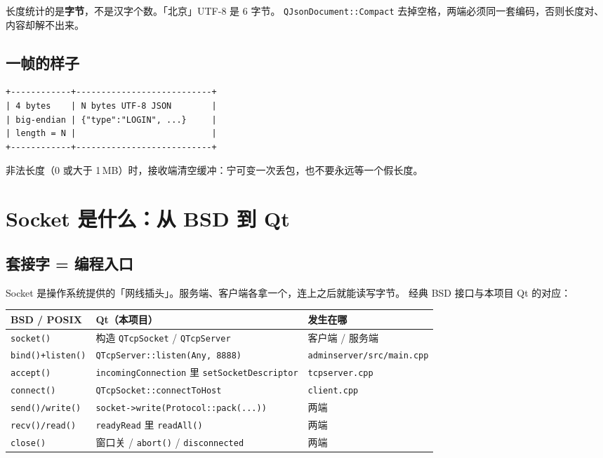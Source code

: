 \documentclass[UTF8,a4paper,11pt]{ctexart}
\begin{document}
长度统计的是\textbf{字节}，不是汉字个数。「北京」UTF-8 是 6 字节。
\texttt{QJsonDocument::Compact} 去掉空格，两端必须同一套编码，否则长度对、内容却解不出来。

\subsection{一帧的样子}

\begin{lstlisting}[language={}]
+------------+---------------------------+
| 4 bytes    | N bytes UTF-8 JSON        |
| big-endian | {"type":"LOGIN", ...}     |
| length = N |                           |
+------------+---------------------------+
\end{lstlisting}

非法长度（0 或大于 1\,MB）时，接收端清空缓冲：宁可变一次丢包，也不要永远等一个假长度。

\section{Socket 是什么：从 BSD 到 Qt}

\subsection{套接字 = 编程入口}

Socket 是操作系统提供的「网线插头」。服务端、客户端各拿一个，连上之后就能读写字节。
经典 BSD 接口与本项目 Qt 的对应：

\begin{center}
\begin{tabular}{lll}
\toprule
BSD / POSIX & Qt（本项目） & 发生在哪 \\
\midrule
\texttt{socket()} & 构造 \texttt{QTcpSocket} / \texttt{QTcpServer} & 客户端 / 服务端 \\
\texttt{bind()+listen()} & \texttt{QTcpServer::listen(Any, 8888)} & \texttt{adminserver/src/main.cpp} \\
\texttt{accept()} & \texttt{incomingConnection} 里 \texttt{setSocketDescriptor} & \texttt{tcpserver.cpp} \\
\texttt{connect()} & \texttt{QTcpSocket::connectToHost} & \texttt{client.cpp} \\
\texttt{send()/write()} & \texttt{socket->write(Protocol::pack(...))} & 两端 \\
\texttt{recv()/read()} & \texttt{readyRead} 里 \texttt{readAll()} & 两端 \\
\texttt{close()} & 窗口关 / \texttt{abort()} / \texttt{disconnected} & 两端 \\
\bottomrule
\end{tabular}
\end{center}
\end{document}
